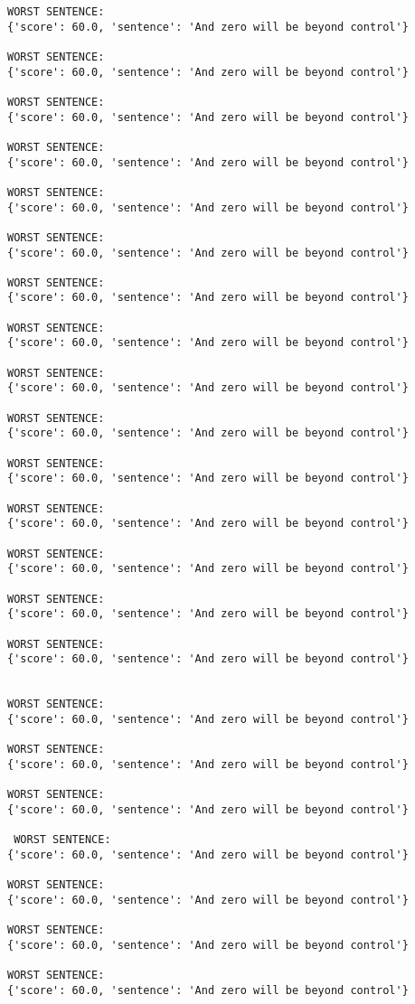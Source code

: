 \documentclass[12pt,a4paper,oneside]{book}
\begin{document}
\begin{verbatim}
WORST SENTENCE:
{'score': 60.0, 'sentence': 'And zero will be beyond control'}

WORST SENTENCE:
{'score': 60.0, 'sentence': 'And zero will be beyond control'}

WORST SENTENCE:
{'score': 60.0, 'sentence': 'And zero will be beyond control'}

WORST SENTENCE:
{'score': 60.0, 'sentence': 'And zero will be beyond control'}

WORST SENTENCE:
{'score': 60.0, 'sentence': 'And zero will be beyond control'}

WORST SENTENCE:
{'score': 60.0, 'sentence': 'And zero will be beyond control'}

WORST SENTENCE:
{'score': 60.0, 'sentence': 'And zero will be beyond control'}

WORST SENTENCE:
{'score': 60.0, 'sentence': 'And zero will be beyond control'}

WORST SENTENCE:
{'score': 60.0, 'sentence': 'And zero will be beyond control'}

WORST SENTENCE:
{'score': 60.0, 'sentence': 'And zero will be beyond control'}

WORST SENTENCE:
{'score': 60.0, 'sentence': 'And zero will be beyond control'}

WORST SENTENCE:
{'score': 60.0, 'sentence': 'And zero will be beyond control'}

WORST SENTENCE:
{'score': 60.0, 'sentence': 'And zero will be beyond control'}

WORST SENTENCE:
{'score': 60.0, 'sentence': 'And zero will be beyond control'}

WORST SENTENCE:
{'score': 60.0, 'sentence': 'And zero will be beyond control'}
 
 
WORST SENTENCE:
{'score': 60.0, 'sentence': 'And zero will be beyond control'}

WORST SENTENCE:
{'score': 60.0, 'sentence': 'And zero will be beyond control'}

WORST SENTENCE:
{'score': 60.0, 'sentence': 'And zero will be beyond control'}

 WORST SENTENCE:
{'score': 60.0, 'sentence': 'And zero will be beyond control'}

WORST SENTENCE:
{'score': 60.0, 'sentence': 'And zero will be beyond control'}

WORST SENTENCE:
{'score': 60.0, 'sentence': 'And zero will be beyond control'}

WORST SENTENCE:
{'score': 60.0, 'sentence': 'And zero will be beyond control'}


\end{verbatim}
\end{document}
